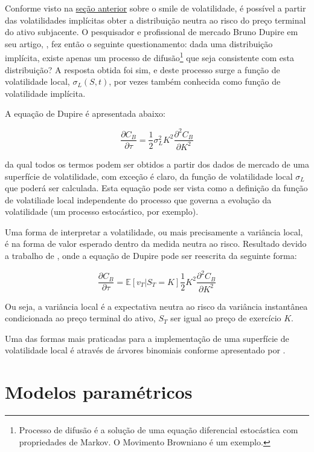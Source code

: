 \documentclass[]{book}
\let\rmarkdownfootnote\footnote%
\def\footnote{\protect\rmarkdownfootnote}
\theoremstyle{definition}
\theoremstyle{definition}
\theoremstyle{definition}
\theoremstyle{remark}
\begin{document}
Conforme visto na \protect\hyperlink{rnd}{seção anterior} sobre o smile
de volatilidade, é possível a partir das volatilidades implícitas obter
a distribuição neutra ao risco do preço terminal do ativo subjacente. O
pesquisador e profissional de mercado Bruno Dupire em seu artigo,
\citet{Dupire1994}, fez então o seguinte questionamento: dada uma
distribuição implícita, existe apenas um processo de difusão\footnote{Processo
  de difusão é a solução de uma equação diferencial estocástica com
  propriedades de Markov. O Movimento Browniano é um exemplo.} que seja
consistente com esta distribuição? A resposta obtida foi sim, e deste
processo surge a função de volatilidade local, \(\sigma_L(S, t)\), por
vezes também conhecida como função de volatilidade implícita.

A equação de Dupire é apresentada abaixo:

\[\frac{\partial C_B}{\partial \tau}=\frac{1}{2}\sigma_L^2K^2\frac{\partial^2C_B}{\partial K^2}
\label{eq:dupire}\]

da qual todos os termos podem ser obtidos a partir dos dados de mercado
de uma superfície de volatilidade, com exceção é claro, da função de
volatilidade local \(\sigma_L\) que poderá ser calculada. Esta equação
pode ser vista como a definição da função de volatiliade local
independente do processo que governa a evolução da volatilidade (um
processo estocástico, por exemplo).

Uma forma de interpretar a volatilidade, ou mais precisamente a
variância local, é na forma de valor esperado dentro da medida neutra ao
risco. Resultado devido a trabalho de \citet{Derman1998}, onde a equação
de Dupire pode ser reescrita da seguinte forma:

\[\frac{\partial C_B}{\partial \tau}=\mathbb E\left[v_T|S_T=K\right]\frac{1}{2}K^2\frac{\partial^2C_B}{\partial K^2}
\label{eq:derman}\]

Ou seja, a variância local é a expectativa neutra ao risco da variância
instantânea condicionada ao preço terminal do ativo, \(S_T\) ser igual
ao preço de exercício \(K\).

Uma das formas mais praticadas para a implementação de uma superfície de
volatilidade local é através de árvores binomiais conforme apresentado
por \citet{Derman1994}.

\section{Modelos paramétricos}\label{modelos-parametricos}
\end{document}
